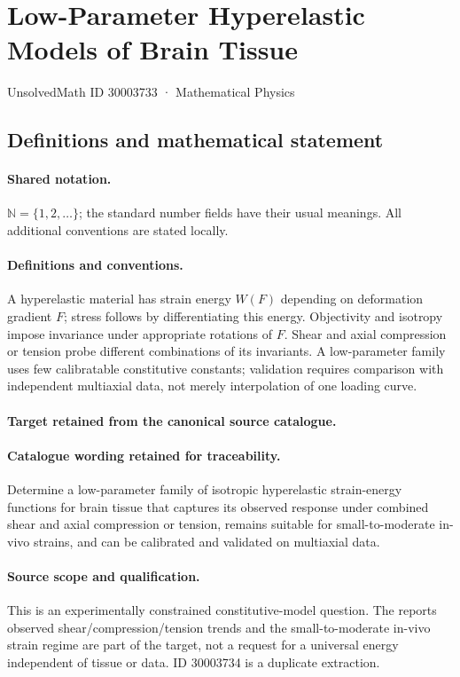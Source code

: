 \documentclass[11pt]{article}
\begin{document}
\setcounter{section}{30003732}
\section{Low-Parameter Hyperelastic Models of Brain Tissue}\label{30003733}
{\small UnsolvedMath ID 30003733 · Mathematical Physics}
\subsection{Definitions and mathematical statement}

\paragraph{Shared notation.}$\mathbb N=\{1,2,\ldots\}$; the standard number fields have their usual meanings. All additional conventions are stated locally.


\paragraph{Definitions and conventions.}
A hyperelastic material has strain energy $W(F)$ depending on deformation gradient $F$; stress follows by differentiating this energy. Objectivity and isotropy impose invariance under appropriate rotations of $F$. Shear and axial compression or tension probe different combinations of its invariants. A low-parameter family uses few calibratable constitutive constants; validation requires comparison with independent multiaxial data, not merely interpolation of one loading curve.

\paragraph{Target retained from the canonical source catalogue.}
\paragraph{Catalogue wording retained for traceability.}
Determine a low-parameter family of isotropic hyperelastic strain-energy functions for brain tissue that captures its observed response under combined shear and axial compression or tension, remains suitable for small-to-moderate in-vivo strains, and can be calibrated and validated on multiaxial data.

\paragraph{Source scope and qualification.}
This is an experimentally constrained constitutive-model question. The report\textquotesingle s observed shear/compression/tension trends and the small-to-moderate in-vivo strain regime are part of the target, not a request for a universal energy independent of tissue or data. ID 30003734 is a duplicate extraction.
\end{document}
